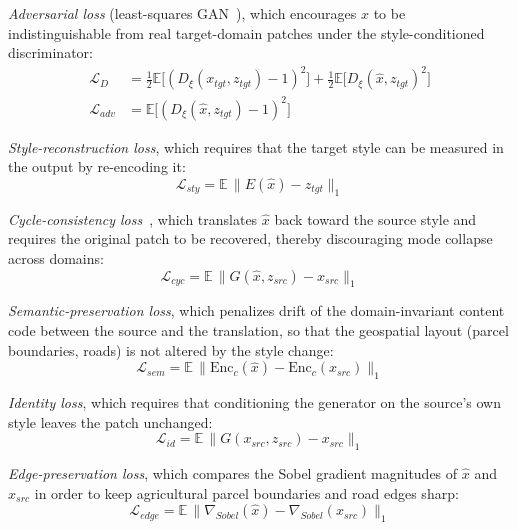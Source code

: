 \documentclass[runningheads]{llncs}
\begin{document}
\emph{Adversarial loss} (least-squares GAN~\cite{mao2017lsgan}), which encourages $\hat{x}$ to be indistinguishable from real target-domain patches under the style-conditioned discriminator:
\begin{align}
\mathcal{L}_D &= \tfrac{1}{2}\mathbb{E}\big[(D_\xi(x_{tgt}, z_{tgt}) - 1)^2\big] + \tfrac{1}{2}\mathbb{E}\big[D_\xi(\hat{x}, z_{tgt})^2\big] \\
\mathcal{L}_{adv} &= \mathbb{E}\big[(D_\xi(\hat{x}, z_{tgt}) - 1)^2\big]
\label{eq:adv}
\end{align}

\emph{Style-reconstruction loss}, which requires that the target style can be measured in the output by re-encoding it:
\begin{equation}
\mathcal{L}_{sty} = \mathbb{E}\,\lVert E(\hat{x}) - z_{tgt} \rVert_1
\label{eq:sty}
\end{equation}

\emph{Cycle-consistency loss}~\cite{zhu2017cyclegan}, which translates $\hat{x}$ back toward the source style and requires the original patch to be recovered, thereby discouraging mode collapse across domains:
\begin{equation}
\mathcal{L}_{cyc} = \mathbb{E}\,\lVert G(\hat{x}, z_{src}) - x_{src} \rVert_1
\label{eq:cyc}
\end{equation}

\emph{Semantic-preservation loss}, which penalizes drift of the domain-invariant content code between the source and the translation, so that the geospatial layout (parcel boundaries, roads) is not altered by the style change:
\begin{equation}
\mathcal{L}_{sem} = \mathbb{E}\,\lVert \mathrm{Enc}_c(\hat{x}) - \mathrm{Enc}_c(x_{src}) \rVert_1
\label{eq:sem}
\end{equation}

\emph{Identity loss}, which requires that conditioning the generator on the source's own style leaves the patch unchanged:
\begin{equation}
\mathcal{L}_{id} = \mathbb{E}\,\lVert G(x_{src}, z_{src}) - x_{src} \rVert_1
\label{eq:id}
\end{equation}

\emph{Edge-preservation loss}, which compares the Sobel gradient magnitudes of $\hat{x}$ and $x_{src}$ in order to keep agricultural parcel boundaries and road edges sharp:
\begin{equation}
\mathcal{L}_{edge} = \mathbb{E}\,\lVert \nabla_{Sobel}(\hat{x}) - \nabla_{Sobel}(x_{src}) \rVert_1
\label{eq:edge}
\end{equation}
\end{document}
